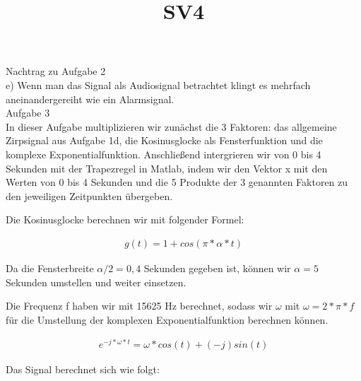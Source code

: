\documentclass[a4paper, 12pt]{article}
\title{SV4}
\begin{document}
\maketitle
\thispagestyle{fancy}

Nachtrag zu Aufgabe 2\\
e) Wenn man das Signal als Audiosignal betrachtet klingt es mehrfach aneinandergereiht wie ein Alarmsignal.\\


Aufgabe 3\\
In dieser Aufgabe multiplizieren wir zun{\"a}chst die 3 Faktoren: das allgemeine Zirpsignal aus Aufgabe 1d, die Kosinusglocke als Fensterfunktion und die komplexe Exponentialfunktion.
Anschließend intergrieren wir von 0 bis 4 Sekunden mit der Trapezregel in Matlab, indem wir den Vektor x mit den Werten von 0 bis 4 Sekunden und die 5 Produkte der 3 genannten Faktoren zu den jeweiligen Zeitpunkten {\"u}bergeben.

Die Kosinusglocke berechnen wir mit folgender Formel:


\begin{center}
	\begin{equation}
    
                \begin{array}{ll}
                 g(t) = 1 + cos(\pi*\alpha*t)
                \end{array}
              
	\end{equation}
\end{center}


Da die Fensterbreite $\alpha/2 = 0,4$ Sekunden gegeben ist, k{\"o}nnen wir $\alpha = 5$ Sekunden umstellen und weiter einsetzen.

Die Frequenz f haben wir mit 15625 Hz berechnet, sodass wir $\omega$ mit $\omega = 2*\pi*f$ f{\"u}r die Umstellung der komplexen Exponentialfunktion berechnen k{\"o}nnen.


\begin{center}
	\begin{equation}
   
                \begin{array}{ll}
                 e^{-j*\omega*t} = \omega*cos(t)+(-j)sin(t)
                \end{array}
             
	\end{equation}
\end{center}


Das Signal berechnet sich wie folgt:
\end{document}
